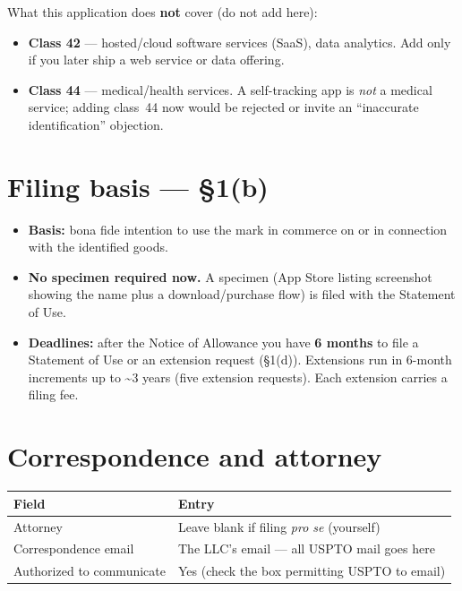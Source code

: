 \documentclass[11pt,a4paper]{article}
\begin{document}
\noindent
What this application does \textbf{not} cover (do not add here):
\begin{itemize}[leftmargin=1.4em,itemsep=0.1em]
\item \textbf{Class 42} --- hosted/cloud software services (SaaS), data
      analytics. Add only if you later ship a web service or data offering.
\item \textbf{Class 44} --- medical/health services. A self-tracking app is
      \emph{not} a medical service; adding class~44 now would be rejected or
      invite an ``inaccurate identification'' objection.
\end{itemize}

\section{Filing basis --- \S1(b)}

\begin{itemize}[leftmargin=1.4em,itemsep=0.1em]
\item \textbf{Basis:} bona fide intention to use the mark in commerce on or in
      connection with the identified goods.
\item \textbf{No specimen required now.} A specimen (App Store listing
      screenshot showing the name plus a download/purchase flow) is filed with
      the Statement of Use.
\item \textbf{Deadlines:} after the Notice of Allowance you have \textbf{6
      months} to file a Statement of Use or an extension request (\S1(d)).
      Extensions run in 6-month increments up to \textasciitilde3 years (five
      extension requests). Each extension carries a filing fee.
\end{itemize}

\section{Correspondence and attorney}

\begin{center}
\begin{tabular}{@{}L{4.4cm}L{11.6cm}@{}}
\toprule
\textbf{Field} & \textbf{Entry} \\
\midrule
Attorney & Leave blank if filing \emph{pro se} (yourself) \\
Correspondence email & The LLC's email --- all USPTO mail goes here \\
Authorized to communicate & Yes (check the box permitting USPTO to email) \\
\bottomrule
\end{tabular}
\end{center}
\end{document}
